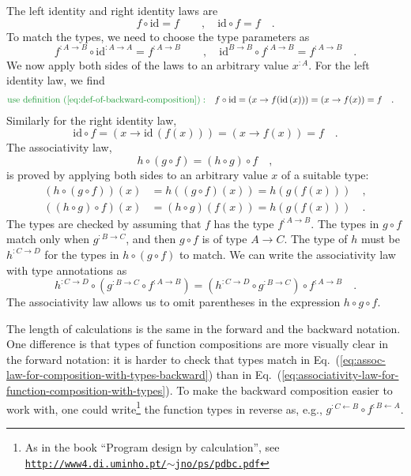 The left identity and right identity laws are
\[
f\circ\text{id}=f\quad\quad,\quad\text{id}\circ f=f\quad.
\]
To match the types, we need to choose the type parameters as
\[
f^{:A\rightarrow B}\circ\text{id}^{:A\rightarrow A}=f^{:A\rightarrow B}\quad\quad,\quad\text{id}^{B\rightarrow B}\circ f^{:A\rightarrow B}=f^{:A\rightarrow B}\quad.
\]
We now apply both sides of the laws to an arbitrary value $x^{:A}$.
For the left identity law, we find
\begin{align*}
{\color{greenunder}\text{use definition~(\ref{eq:def-of-backward-composition})}:}\quad & f\circ\text{id}=\left(x\rightarrow f(\text{id}\,(x))\right)=\left(x\rightarrow f(x)\right)=f\quad.
\end{align*}
Similarly for the right identity law,
\[
\text{id}\circ f=\left(x\rightarrow\text{id}\,(f(x))\right)=\left(x\rightarrow f\left(x\right)\right)=f\quad.
\]
The associativity law,
\[
h\circ\left(g\circ f\right)=\left(h\circ g\right)\circ f\quad,
\]
is proved by applying both sides to an arbitrary value $x$ of a suitable
type:
\begin{align*}
\left(h\circ\left(g\circ f\right)\right)(x) & =h\left(\left(g\circ f\right)(x)\right)=h\left(g\left(f\left(x\right)\right)\right)\quad,\\
\left(\left(h\circ g\right)\circ f\right)(x) & =\left(h\circ g\right)\left(f(x)\right)=h\left(g\left(f\left(x\right)\right)\right)\quad.
\end{align*}
The types are checked by assuming that $f$ has the type $f^{:A\rightarrow B}$.
The types in $g\circ f$ match only when $g^{:B\rightarrow C}$, and
then $g\circ f$ is of type $A\rightarrow C$. The type of $h$ must
be $h^{:C\rightarrow D}$ for the types in $h\circ\left(g\circ f\right)$
to match. We can write the associativity law with type annotations
as
\begin{equation}
h^{:C\rightarrow D}\circ(g^{:B\rightarrow C}\circ f^{:A\rightarrow B})=(h^{:C\rightarrow D}\circ g^{:B\rightarrow C})\circ f^{:A\rightarrow B}\quad.\label{eq:assoc-law-for-composition-with-types-backward}
\end{equation}
The associativity law allows us to omit parentheses in the expression
$h\circ g\circ f$. 

The length of calculations is the same in the forward and the backward
notation. One difference is that types of function compositions are
more visually clear in the forward notation: it is harder to check
that types match in Eq.~(\ref{eq:assoc-law-for-composition-with-types-backward})
than in Eq.~(\ref{eq:associativity-law-for-function-composition-with-types}).
To make the backward composition easier to work with, one could write\footnote{As in the book \textsf{``}Program design by calculation\textsf{''}, see \texttt{\href{http://www4.di.uminho.pt/~jno/ps/pdbc.pdf}{http://www4.di.uminho.pt/$\sim$jno/ps/pdbc.pdf}}}
the function types in reverse as, e.g., $g^{:C\leftarrow B}\circ f^{:B\leftarrow A}$.

